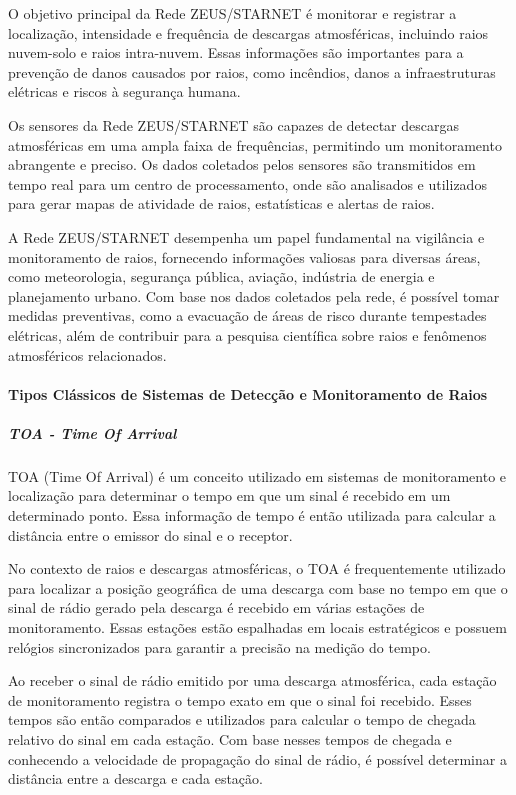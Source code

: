 \documentclass[a4paper, 12pt, onecolumn,singlespacing]{article}
\begin{document}
	O objetivo principal da Rede ZEUS/STARNET é monitorar e registrar a localização, intensidade e frequência de descargas atmosféricas, incluindo raios nuvem-solo e raios intra-nuvem. Essas informações são importantes para a prevenção de danos causados por raios, como incêndios, danos a infraestruturas elétricas e riscos à segurança humana.
	
	Os sensores da Rede ZEUS/STARNET são capazes de detectar descargas atmosféricas em uma ampla faixa de frequências, permitindo um monitoramento abrangente e preciso. Os dados coletados pelos sensores são transmitidos em tempo real para um centro de processamento, onde são analisados e utilizados para gerar mapas de atividade de raios, estatísticas e alertas de raios.
	
	A Rede ZEUS/STARNET desempenha um papel fundamental na vigilância e monitoramento de raios, fornecendo informações valiosas para diversas áreas, como meteorologia, segurança pública, aviação, indústria de energia e planejamento urbano. Com base nos dados coletados pela rede, é possível tomar medidas preventivas, como a evacuação de áreas de risco durante tempestades elétricas, além de contribuir para a pesquisa científica sobre raios e fenômenos atmosféricos relacionados.
	\paragraph{Tipos Clássicos de Sistemas de Detecção e Monitoramento de Raios}
	
	\subparagraph{TOA - \textit{Time Of Arrival}}
	TOA (Time Of Arrival) é um conceito utilizado em sistemas de monitoramento e localização para determinar o tempo em que um sinal é recebido em um determinado ponto. Essa informação de tempo é então utilizada para calcular a distância entre o emissor do sinal e o receptor.
	
	No contexto de raios e descargas atmosféricas, o TOA é frequentemente utilizado para localizar a posição geográfica de uma descarga com base no tempo em que o sinal de rádio gerado pela descarga é recebido em várias estações de monitoramento. Essas estações estão espalhadas em locais estratégicos e possuem relógios sincronizados para garantir a precisão na medição do tempo.
	
	Ao receber o sinal de rádio emitido por uma descarga atmosférica, cada estação de monitoramento registra o tempo exato em que o sinal foi recebido. Esses tempos são então comparados e utilizados para calcular o tempo de chegada relativo do sinal em cada estação. Com base nesses tempos de chegada e conhecendo a velocidade de propagação do sinal de rádio, é possível determinar a distância entre a descarga e cada estação.
	
\end{document}
